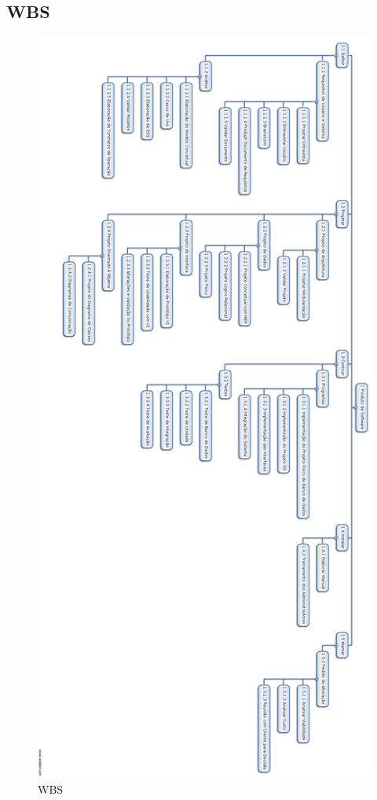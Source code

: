 \documentclass[a4paper,11pt]{article}
\begin{document}
	\subsection{WBS}
	\begin{figure}[!Htb]
    	\centering
        \includegraphics[height=\textheight]{WBS.png}
        \caption{WBS}
     	\label{WBSimg}
    \end{figure}
\end{document}
